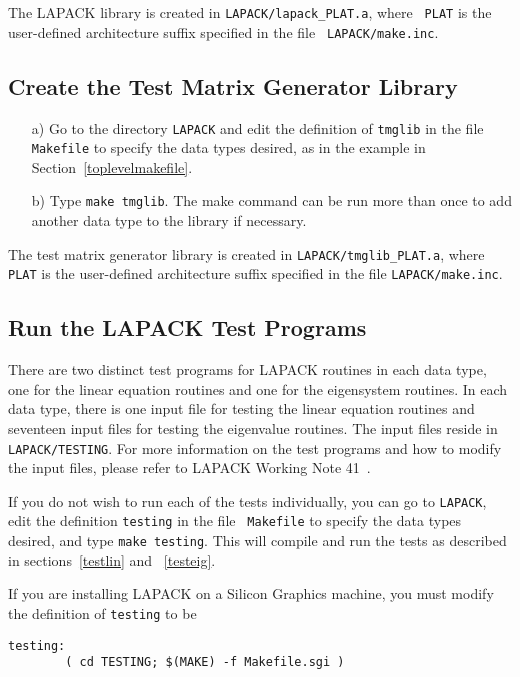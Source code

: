 \noindent
The LAPACK library is created in {\tt LAPACK/lapack\_PLAT.a}, where {\tt
PLAT} is the user-defined architecture suffix specified in the file {\tt
LAPACK/make.inc}.

\subsection{Create the Test Matrix Generator Library}

\begin{itemize}
\item[a)]
Go to the directory {\tt LAPACK} and edit the definition of {\tt tmglib}
in the file {\tt Makefile} to specify the data types desired, as in the
example in Section~\ref{toplevelmakefile}.

\item[b)]
Type {\tt make tmglib}.
The make command can be run more than once to add another
data type to the library if necessary.  

\end{itemize}

\noindent
The test matrix generator library is created in {\tt LAPACK/tmglib\_PLAT.a},
where {\tt PLAT} is the user-defined architecture suffix specified in the 
file {\tt LAPACK/make.inc}.

\subsection{Run the LAPACK Test Programs}

\dent
There are two distinct test programs for LAPACK routines
in each data type, one for the linear equation routines and
one for the eigensystem routines.
In each data type, there is one input file for testing the linear
equation routines and seventeen input files for testing the eigenvalue
routines.
The input files reside in {\tt LAPACK/TESTING}.
For more information on the test programs and how to modify the
input files, please refer to LAPACK Working Note 41~\cite{WN41}.

If you do not wish to run each of the tests individually, you can
go to {\tt LAPACK}, edit the definition {\tt testing} in the file {\tt
Makefile} to specify the data types desired, and type {\tt make
testing}.  This will
compile and run the tests as described in sections~\ref{testlin} 
and ~\ref{testeig}.

If you are installing LAPACK on a Silicon Graphics machine, you must
modify the definition of {\tt testing} to be
\begin{verbatim}
testing:
        ( cd TESTING; $(MAKE) -f Makefile.sgi )
\end{verbatim}

